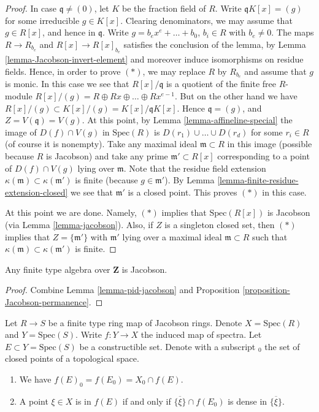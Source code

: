\begin{proof}
\medskip\noindent
In case $\mathfrak q \not = (0)$, let $K$ be the
fraction field of $R$. Write $\mathfrak q K[x]
= (g)$ for some irreducible $g \in K[x]$. Clearing
denominators, we may assume that $g \in R[x]$, and
hence in $\mathfrak q$. Write $g = b_e x^e + \ldots + b_0$,
$b_i \in R$ with $b_e \not= 0$.
The maps $R \to R_{b_e}$ and $R[x] \to R[x]_{b_e}$
satisfies the conclusion of the lemma, by Lemma
\ref{lemma-Jacobson-invert-element} and moreover induce
isomorphisms on residue fields. Hence, in order to prove $(*)$,
we may replace $R$ by $R_{b_e}$ and assume that $g$ is monic.
In this case we see that $R[x]/\mathfrak q$ is a 
quotient of the finite free $R$-module
$R[x]/(g) = R \oplus Rx \oplus \ldots \oplus Rx^{e-1}$.
But on the other hand we have $R[x]/(g) \subset K[x]/(g)
= K[x]/\mathfrak q K[x]$. Hence $\mathfrak q = (g)$, and
$Z = V(\mathfrak q) = V(g)$. At this point, by Lemma
\ref{lemma-affineline-special} the image of $D(f) \cap V(g)$
in $\text{Spec}(R)$ is $D(r_1) \cup \ldots \cup D(r_d)$
for some $r_i \in R$ (of course it is nonempty).
Take any maximal ideal $\mathfrak m \subset R$ in this
image (possible because $R$ is Jacobson) and take any
prime $\mathfrak m' \subset R[x]$
corresponding to a point of $D(f) \cap V(g)$
lying over $\mathfrak m$. Note that the residue field
extension $\kappa(\mathfrak m) \subset \kappa(\mathfrak m')$
is finite (because $g \in \mathfrak m'$). By
Lemma \ref{lemma-finite-residue-extension-closed}
we see that $\mathfrak m'$ is a closed point.
This proves $(*)$ in this case.

\medskip\noindent
At this point we are done. Namely, $(*)$ implies
that $\text{Spec}(R[x])$ is Jacobson (via Lemma \ref{lemma-jacobson}).
Also, if $Z$ is a singleton closed set, then $(*)$ implies that
$Z = \{ \mathfrak m' \}$ with $\mathfrak m'$ lying over a maximal
ideal $\mathfrak m \subset R$ such that $\kappa(\mathfrak m)
\subset \kappa(\mathfrak m')$ is finite.
\end{proof}

\begin{lemma}
\label{lemma-corollary-jacobson}
Any finite type algebra over $\mathbf{Z}$ is Jacobson.
\end{lemma}

\begin{proof}
Combine Lemma \ref{lemma-pid-jacobson} and
Proposition \ref{proposition-Jacobson-permanence}.
\end{proof}

\begin{lemma}
\label{lemma-image-finite-type-map-Jacobson-rings}
Let $R \to S$ be a finite type ring map of Jacobson rings.
Denote $X = \text{Spec}(R)$ and $Y = \text{Spec}(S)$.
Write $f : Y \to X$ the induced
map of spectra. Let $E \subset Y = \text{Spec}(S)$ be a
constructible set. Denote with a subscript ${}_0$ the set
of closed points of a topological space.
\begin{enumerate}
\item We have $f(E)_0 = f(E_0) = X_0 \cap f(E)$.
\item A point $\xi \in X$ is in $f(E)$ if and only if
$\overline{\{\xi\}} \cap f(E_0)$ is dense in $\overline{\{\xi\}}$.
\end{enumerate}
\end{lemma}

